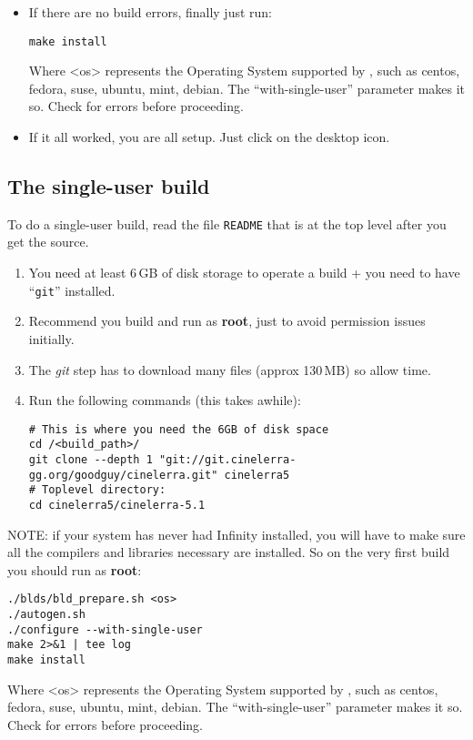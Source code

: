\begin{itemize}
\item If there are no build errors, finally just run:
\begin{lstlisting}[style=sh]
make install
\end{lstlisting}
Where <os> represents the Operating System supported by \CGG{}, such
as centos, fedora, suse, ubuntu, mint, debian.
The ``with-single-user'' parameter makes it so.
Check for errors before proceeding.


\item If it all worked, you are all setup. Just click on the \CGG{}
  desktop icon.
\end{itemize}


\subsection{The single-user build}
\label{sec:single-user-build}

To do a single-user build, read the file \texttt{README} that is at
the top level after you get the source.

\begin{enumerate}
\item You need at least 6\,GB of disk storage to operate a build +
  you need to have “\texttt{git}” installed.

\item Recommend you build and run as \textbf{root}, just to avoid
  permission issues initially.
\item The \textit{git} step has to download many files (approx
  130\,MB) so allow time.

\item Run the following commands (this takes awhile):
\begin{lstlisting}[style=sh]
# This is where you need the 6GB of disk space
cd /<build_path>/
git clone --depth 1 "git://git.cinelerra-gg.org/goodguy/cinelerra.git" cinelerra5
# Toplevel directory:
cd cinelerra5/cinelerra-5.1
\end{lstlisting}
\end{enumerate}

NOTE: if your system has never had \CGG{} Infinity installed, you
will have to make sure all the compilers and libraries necessary are
installed. So on the very first build you should run as
\textbf{root}:

\begin{lstlisting}[style=sh]
./blds/bld_prepare.sh <os>
./autogen.sh
./configure --with-single-user
make 2>&1 | tee log
make install
\end{lstlisting}
Where <os> represents the Operating System supported by \CGG{}, such
as centos, fedora, suse, ubuntu, mint, debian.
The ``with-single-user'' parameter makes it so.
Check for errors before proceeding.


